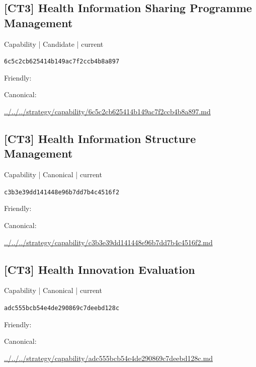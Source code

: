 \documentclass[10pt,a4paper]{article}
\begin{document}
\subsection*{[CT3] Health Information Sharing Programme Management}
{\small Capability | Candidate | current}\par
\texttt{6c5c2cb625414b149ac7f2ccb4b8a897}\par
Friendly: \par
Canonical: \par
{\footnotesize\url{../../../strategy/capability/6c5c2cb625414b149ac7f2ccb4b8a897.md}}\par
\subsection*{[CT3] Health Information Structure Management}
{\small Capability | Canonical | current}\par
\texttt{c3b3e39dd141448e96b7dd7b4c4516f2}\par
Friendly: \par
Canonical: \par
{\footnotesize\url{../../../strategy/capability/c3b3e39dd141448e96b7dd7b4c4516f2.md}}\par
\subsection*{[CT3] Health Innovation Evaluation}
{\small Capability | Canonical | current}\par
\texttt{adc555bcb54e4de290869c7deebd128c}\par
Friendly: \par
Canonical: \par
{\footnotesize\url{../../../strategy/capability/adc555bcb54e4de290869c7deebd128c.md}}\par
\end{document}

